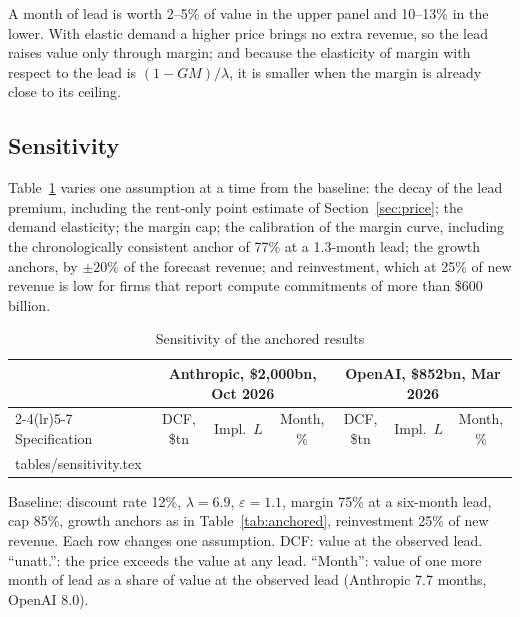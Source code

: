\documentclass[12pt]{article}
\makeatletter
\newcommand{\tabinput}[1]{\@@input #1 }
\makeatother
\begin{document}
A month of lead is worth 2--5\% of value in the upper panel and 10--13\% in the lower. With elastic demand a higher price brings no extra revenue, so the lead raises value only through margin; and because the elasticity of margin with respect to the lead is $(1-GM)/\lambda$, it is smaller when the margin is already close to its ceiling.

\subsection{Sensitivity}

Table~\ref{tab:sens} varies one assumption at a time from the baseline: the decay of the lead premium, including the rent-only point estimate of Section~\ref{sec:price}; the demand elasticity; the margin cap; the calibration of the margin curve, including the chronologically consistent anchor of 77\% at a 1.3-month lead; the growth anchors, by $\pm 20\%$ of the forecast revenue; and reinvestment, which at 25\% of new revenue is low for firms that report compute commitments of more than \$600 billion.

\begin{table}[t]
\centering
\begin{threeparttable}
\caption{Sensitivity of the anchored results}
\label{tab:sens}
\footnotesize
\setlength{\tabcolsep}{4pt}
\begin{tabular}{lcccccc}
\toprule
 & \multicolumn{3}{c}{Anthropic, \$2,000bn, Oct 2026} & \multicolumn{3}{c}{OpenAI, \$852bn, Mar 2026} \\
\cmidrule(lr){2-4}\cmidrule(lr){5-7}
Specification & DCF, \$tn & Impl.\ $L$ & Month, \% & DCF, \$tn & Impl.\ $L$ & Month, \% \\
\midrule
\tabinput{tables/sensitivity.tex}
\bottomrule
\end{tabular}
\begin{tablenotes}\footnotesize
\item Baseline: discount rate 12\%, $\lambda = 6.9$, $\varepsilon = 1.1$, margin 75\% at a six-month lead, cap 85\%, growth anchors as in Table~\ref{tab:anchored}, reinvestment 25\% of new revenue. Each row changes one assumption. DCF: value at the observed lead. ``unatt.'': the price exceeds the value at any lead. ``Month'': value of one more month of lead as a share of value at the observed lead (Anthropic 7.7 months, OpenAI 8.0).
\end{tablenotes}
\end{threeparttable}
\end{table}
\end{document}
